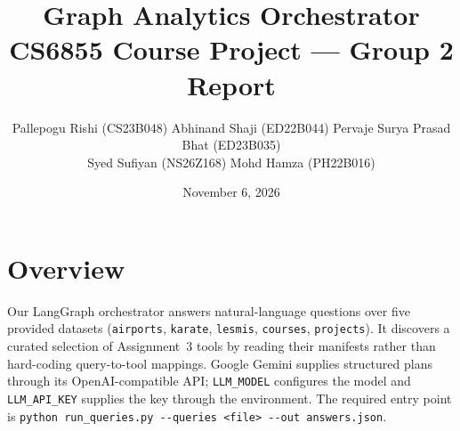 \documentclass[10pt,a4paper]{article}
\title{\vspace{-1.2cm}\textbf{Graph Analytics Orchestrator}\\[2pt]\large CS6855 Course Project --- Group 2 Report}
\author{\small Pallepogu Rishi (CS23B048) \quad Abhinand Shaji (ED22B044) \quad
Pervaje Surya Prasad Bhat (ED23B035)\\ \small Syed Sufiyan (NS26Z168) \quad Mohd Hamza (PH22B016)}
\date{November 6, 2026}
\newcommand{\tool}[1]{\texttt{#1}}
\begin{document}
\maketitle
\vspace{-0.8cm}

\section{Overview}
Our LangGraph orchestrator answers natural-language questions over five provided datasets
(\tool{airports}, \tool{karate}, \tool{lesmis}, \tool{courses}, \tool{projects}). It discovers a curated
selection of Assignment~3 tools by reading their manifests rather than hard-coding query-to-tool mappings.
Google Gemini supplies structured plans through its OpenAI-compatible API; \tool{LLM\_MODEL} configures the model
and \tool{LLM\_API\_KEY} supplies the key through the environment. The required entry point is
\texttt{python run\_queries.py -{}-queries <file> -{}-out answers.json}.
\end{document}

